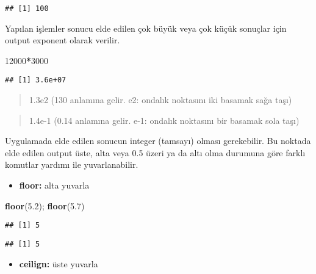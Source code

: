 \documentclass[
]{book}
\newenvironment{Shaded}{\begin{snugshade}}{\end{snugshade}}
\newcommand{\DecValTok}[1]{\textcolor[rgb]{0.00,0.00,0.81}{#1}}
\newcommand{\FloatTok}[1]{\textcolor[rgb]{0.00,0.00,0.81}{#1}}
\newcommand{\KeywordTok}[1]{\textcolor[rgb]{0.13,0.29,0.53}{\textbf{#1}}}
\newcommand{\NormalTok}[1]{#1}
\newcommand{\OperatorTok}[1]{\textcolor[rgb]{0.81,0.36,0.00}{\textbf{#1}}}
\providecommand{\tightlist}{%
  \setlength{\itemsep}{0pt}\setlength{\parskip}{0pt}}
\begin{document}
\begin{verbatim}
## [1] 100
\end{verbatim}

Yapılan işlemler sonucu elde edilen çok büyük veya çok küçük sonuçlar için output exponent olarak verilir.

\begin{Shaded}
\begin{Highlighting}[]
\DecValTok{12000}\OperatorTok{*}\DecValTok{3000}
\end{Highlighting}
\end{Shaded}

\begin{verbatim}
## [1] 3.6e+07
\end{verbatim}

\begin{quote}
1.3e2 (130 anlamına gelir. e2: ondalık noktasını iki basamak sağa taşı)
\end{quote}

\begin{quote}
1.4e-1 (0.14 anlamına gelir. e-1: ondalık noktasını bir basamak sola taşı)
\end{quote}

Uygulamada elde edilen sonucun integer (tamsayı) olması gerekebilir. Bu noktada elde edilen output üste, alta veya 0.5 üzeri ya da altı olma durumuna göre farklı komutlar yardımı ile yuvarlanabilir.

\begin{itemize}
\tightlist
\item
  \textbf{floor:} alta yuvarla
\end{itemize}

\begin{Shaded}
\begin{Highlighting}[]
\KeywordTok{floor}\NormalTok{(}\FloatTok{5.2}\NormalTok{); }\KeywordTok{floor}\NormalTok{(}\FloatTok{5.7}\NormalTok{)}
\end{Highlighting}
\end{Shaded}

\begin{verbatim}
## [1] 5
\end{verbatim}

\begin{verbatim}
## [1] 5
\end{verbatim}

\begin{itemize}
\tightlist
\item
  \textbf{ceilign:} üste yuvarla
\end{itemize}
\end{document}
